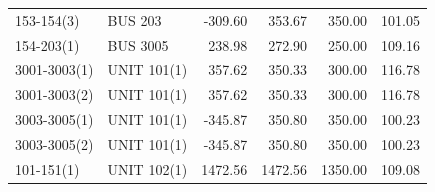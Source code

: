 \documentclass[10pt]{report}
\begin{document}
\begin{table}[H]
{\begin{tabular}{llrrrr}
153-154(3) & BUS 203 & -309.60 & 353.67 & 350.00 & 101.05 \\
154-203(1) & BUS 3005 & 238.98 & 272.90 & 250.00 & 109.16 \\
3001-3003(1) & UNIT 101(1) & 357.62 & 350.33 & 300.00 & 116.78 \\
3001-3003(2) & UNIT 101(1) & 357.62 & 350.33 & 300.00 & 116.78 \\
3003-3005(1) & UNIT 101(1) & -345.87 & 350.80 & 350.00 & 100.23 \\
3003-3005(2) & UNIT 101(1) & -345.87 & 350.80 & 350.00 & 100.23 \\
101-151(1) & UNIT 102(1) & 1472.56 & 1472.56 & 1350.00 & 109.08 \\
\bottomrule
\end{tabular}}
\end{table}
\end{document}
